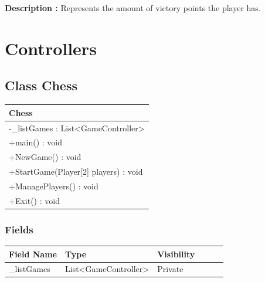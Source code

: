 \documentclass[12pt]{article}
\begin{document}
    \textbf{Description :} Represents the amount of victory points the player has.

    \newpage



    \section{Controllers}


    \subsection{Class Chess}

    \begin{table}[H]
        \begin{tabular}{|l|}
            \hline
            \rowcolor[HTML]{C0C0C0}
            \textbf{Chess}                                                 \\ \hline
            \rowcolor[HTML]{EFEFEF}
            -\_listGames : List\textless{}{}GameController\textgreater{}{} \\ \hline
            +main() : void                                                 \\ \hline
            +NewGame() : void                                              \\ \hline
            +StartGame(Player{[}2{]} players) : void                       \\ \hline
            +ManagePlayers() : void                                        \\ \hline
            +Exit() : void                                                 \\ \hline
        \end{tabular}
    \end{table}

    \subsubsection{Fields}

    \begin{table}[H]
        \begin{tabular}{llllll}
            \hline
            \multicolumn{1}{|l|}{\cellcolor[HTML]{EFEFEF}\textbf{Field Name}} & \multicolumn{1}{l|}{\cellcolor[HTML]{EFEFEF}\textbf{Type}} & \multicolumn{1}{l|}{\cellcolor[HTML]{EFEFEF}\textbf{Visibility}} \\ \hline
            \multicolumn{1}{|l|}{\_listGames}                                 & \multicolumn{1}{l|}{List\textless{}GameController\textgreater{}}                                & \multicolumn{1}{l|}{Private}                                     \\ \hline
        \end{tabular}
    \end{table}
\end{document}
